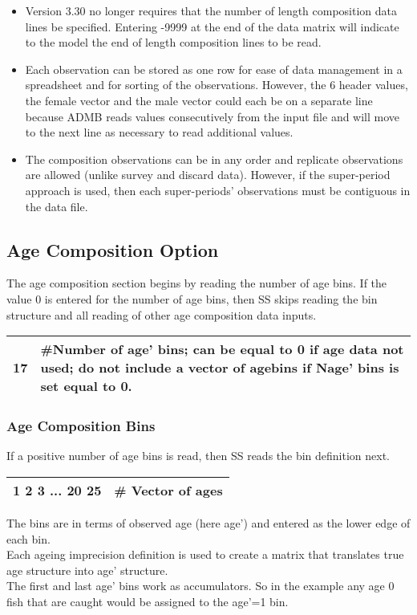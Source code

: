 \begin{description}
\begin{itemize}
		\item Version 3.30 no longer requires that the number of length composition data lines be specified.  Entering -9999 at the end of the data matrix will indicate to the model the end of length composition lines to be read.
		\item Each observation can be stored as one row for ease of data management in a spreadsheet and for sorting of the observations.  However, the 6 header values, the female vector and the male vector could each be on a separate line because ADMB reads values consecutively from the input file and will move to the next line as necessary to read additional values.
		\item The composition observations can be in any order and replicate observations are allowed (unlike survey and discard data).  However, if the super-period approach is used, then each super-periods’ observations must be contiguous in the data file.
	\end{itemize}
\end{description}

\subsection{Age Composition Option}
The age composition section begins by reading the number of age bins.  If the value 0 is entered for the number of age bins, then SS skips reading the bin structure and all reading of other age composition data inputs.
\begin{center}
	\begin{tabular}{p{3cm} p{12cm}  }
		\hline
		17 & \#Number of age' bins; can be equal to 0 if age data not used; do not include a vector of agebins if Nage' bins is set equal to 0.\\
		\hline
	\end{tabular}
\end{center}


\subsubsection{Age Composition Bins}
If a positive number of age bins is read, then SS reads the bin definition next.
\begin{center}
	\begin{tabular}{p{3cm} p{12cm}  }
		\hline
		1 2 3 ... 20 25 & \# Vector of ages\\
		\hline		
	\end{tabular}
\end{center}
The bins are in terms of observed age (here age’) and entered as the lower edge of each bin.
\\Each ageing imprecision definition is used to create a matrix that translates true age structure into age' structure.
\\The first and last age' bins work as accumulators.  So in the example any age 0 fish that are caught would be assigned to the age’=1 bin.

